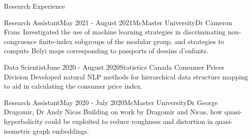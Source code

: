 \begin{rSection}{Research Experience}



\begin{rSubsection}{Research Assistant}{May 2021 - August 2021}{McMaster University}{Dr Cameron Franc}
	Investigated the use of machine learning strategies in discriminating non-congruence finite-index subgroups of the modular group, and strategies to compute Belyi maps corresponding to passports of dessins d'enfants.
\end{rSubsection}

\begin{rSubsection}{Data Scientist}{June 2020 - August 2020}{Statistics Canada }{Consumer Prices Division}
	Developed natural NLP methods for hierarchical data structure mapping to aid in calculating the consumer price index.
\end{rSubsection}


\begin{rSubsection}{Research Assistant}{May 2020 - July 2020}{McMaster University}{Dr George Dragomir, Dr Andy Nicas}
	Building on work by Dragomir and Nicas, how quasi-hyperbolicity could be exploited to reduce roughness and distortion in quasi-isometric graph embeddings.
\end{rSubsection}




\end{rSection}

